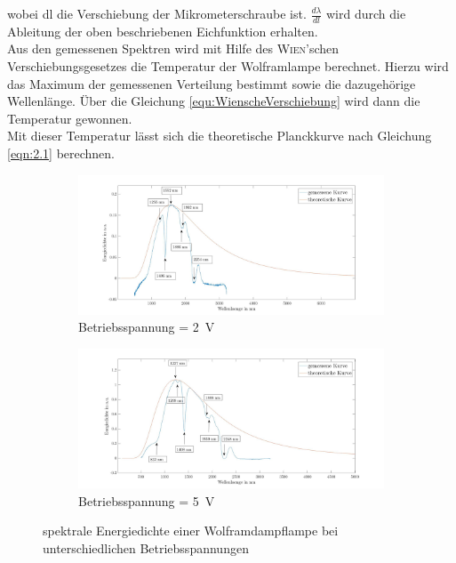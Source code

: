 \documentclass[a4paper,twoside,final]{article}
\begin{document}
wobei dl die Verschiebung der Mikrometerschraube ist.
$\frac{d\lambda}{dl}$ wird durch die Ableitung der oben beschriebenen Eichfunktion erhalten.\\

Aus den gemessenen Spektren wird mit Hilfe des \textsc{Wien}'schen Verschiebungsgesetzes die Temperatur der Wolframlampe berechnet. Hierzu wird das Maximum der gemessenen Verteilung bestimmt sowie die dazugehörige Wellenlänge. Über die Gleichung \ref{equ:WienscheVerschiebung} wird dann die Temperatur gewonnen. \\
Mit dieser Temperatur lässt sich die theoretische Planckkurve nach Gleichung \ref{eqn:2.1} berechnen.

\begin{figure}[htp]
  \centering
  \begin{subfigure}{0.9\textwidth}
    \includegraphics[width=\textwidth]{Bilder/Wolframlampe2V.jpg}
    \caption{Betriebsspannung = \SI{2}{\volt}}
  \end{subfigure}
  \begin{subfigure}{0.9\textwidth}
    \includegraphics[width=\textwidth]{Bilder/Wolframlampe5V.jpg}
    \caption{Betriebsspannung = \SI{5}{\volt}}
  \end{subfigure}\hspace{0.5cm}
  \caption{spektrale Energiedichte einer Wolframdampflampe bei unterschiedlichen Betriebsspannungen}
  \label{fig:Wolframlampe}
\end{figure}
\end{document}

